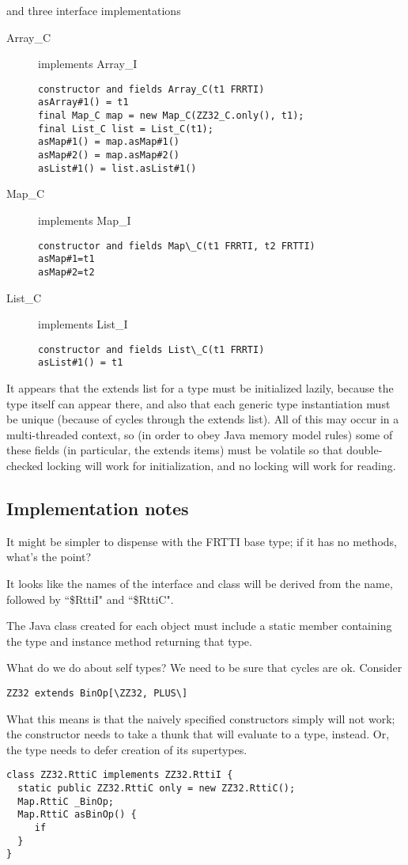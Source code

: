 \documentclass[11pt]{article}
\begin{document}
and three interface implementations
\begin{description}
\item[Array\_C] implements Array\_I
\begin{verbatim}
constructor and fields Array_C(t1 FRRTI)
asArray#1() = t1
final Map_C map = new Map_C(ZZ32_C.only(), t1);
final List_C list = List_C(t1);
asMap#1() = map.asMap#1()
asMap#2() = map.asMap#2()
asList#1() = list.asList#1()
\end{verbatim}
\item[Map\_C] implements Map\_I
\begin{verbatim}
constructor and fields Map\_C(t1 FRRTI, t2 FRTTI)
asMap#1=t1
asMap#2=t2
\end{verbatim}
\item[List\_C] implements List\_I
\begin{verbatim}
constructor and fields List\_C(t1 FRRTI)
asList#1() = t1
\end{verbatim}
\end{description}

It appears that the extends list for a type must be initialized lazily, because the type itself can appear there, and also that each generic type instantiation must be unique (because of cycles through the extends list).  All of this may occur in a multi-threaded context, so (in order to obey Java memory model rules) some of these fields (in particular, the extends items) must be volatile so that double-checked locking will work for initialization, and no locking will work for reading.

\subsection{Implementation notes}
It might be simpler to dispense with the FRTTI base type; if it has no methods, what's the point?

It looks like the names of the interface and class will be derived from the name, followed by ``\$RttiI" and ``\$RttiC".

The Java class created for each object must include a static member containing the type and instance method returning that type.

What do we do about self types?  We need to be sure that cycles are ok.  Consider
\begin{verbatim}
ZZ32 extends BinOp[\ZZ32, PLUS\]
\end{verbatim}
What this means is that the naively specified constructors simply will not work; the constructor needs to take a thunk that will evaluate to a type, instead.  Or, the type needs to defer creation of its supertypes.
\begin{verbatim}
class ZZ32.RttiC implements ZZ32.RttiI {
  static public ZZ32.RttiC only = new ZZ32.RttiC();
  Map.RttiC _BinOp;
  Map.RttiC asBinOp() {
     if 
  }
}
\end{verbatim}
\end{document}
